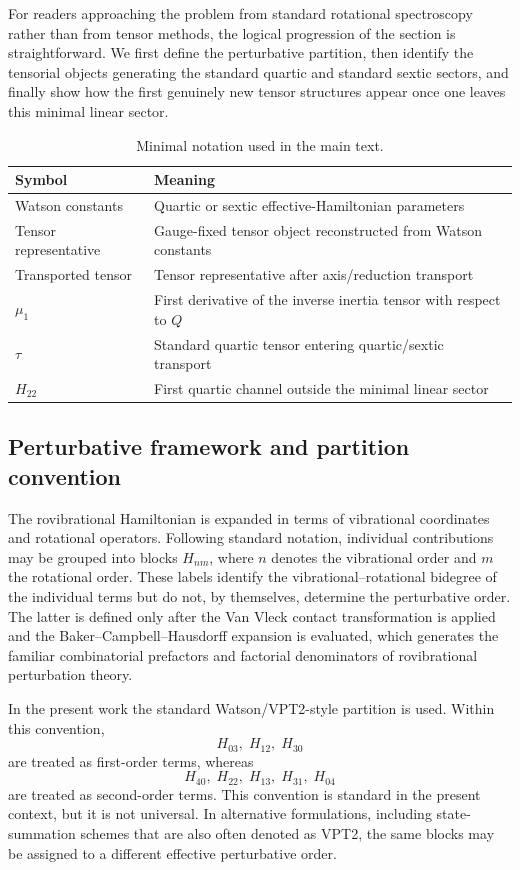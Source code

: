 \documentclass[journal=jacsat,manuscript=article]{achemso}
\begin{document}
For readers approaching the problem from standard rotational
spectroscopy rather than from tensor methods, the logical progression
of the section is straightforward. We first define the perturbative
partition, then identify the tensorial objects generating the standard
quartic and standard sextic sectors, and finally show how the first
genuinely new tensor structures appear once one leaves this minimal
linear sector.

\begin{table}[h]
\centering
\caption{Minimal notation used in the main text.}
\begin{tabular}{ll}
\hline
Symbol & Meaning \\
\hline
Watson constants & Quartic or sextic effective-Hamiltonian parameters \\
Tensor representative & Gauge-fixed tensor object reconstructed from Watson constants \\
Transported tensor & Tensor representative after axis/reduction transport \\
$\mu_1$ & First derivative of the inverse inertia tensor with respect to $Q$ \\
$\tau$ & Standard quartic tensor entering quartic/sextic transport \\
$H_{22}$ & First quartic channel outside the minimal linear sector \\
\hline
\end{tabular}
\end{table}

\subsection{Perturbative framework and partition convention}

The rovibrational Hamiltonian is expanded in terms of vibrational
coordinates and rotational operators. Following standard notation,
individual contributions may be grouped into blocks $H_{nm}$, where
$n$ denotes the vibrational order and $m$ the rotational order.
These labels identify the vibrational--rotational bidegree of the
individual terms but do not, by themselves, determine the perturbative
order. The latter is defined only after the Van Vleck contact
transformation is applied and the Baker--Campbell--Hausdorff expansion
is evaluated, which generates the familiar combinatorial prefactors
and factorial denominators of rovibrational perturbation
theory.\cite{Watson1967,Watson1968,Watson1968JCP,AlievWatson1976}

In the present work the standard Watson/VPT2-style partition is used.
Within this convention,
\begin{equation}
H_{03},\; H_{12},\; H_{30}
\end{equation}
are treated as first-order terms, whereas
\begin{equation}
H_{40},\; H_{22},\; H_{13},\; H_{31},\; H_{04}
\end{equation}
are treated as second-order terms. This convention is standard in the
present context, but it is not universal. In alternative formulations,
including state-summation schemes that are also often denoted as VPT2,
the same blocks may be assigned to a different effective perturbative
order.\cite{Franke2023}
\end{document}
